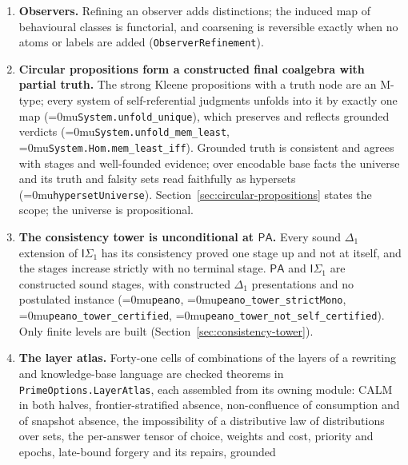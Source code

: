 \documentclass[11pt]{article}
\newcommand{\leanname}[1]{\textup{\Urlmuskip=0mu\relax\nolinkurl{#1}}}
\theoremstyle{definition}
\theoremstyle{remark}
\begin{document}
\begin{enumerate}
  determines the equations, the equations determine behavioural equivalence
  under every observer and equality in every model, fine behavioural
  equivalence determines coarse, occurrence identity erases to endpoints, and
  lineage determines reachability only (\texttt{IdentityNotions}).  A family
  descends through an observer exactly when it is invariant under that
  observer's behavioural equivalence (\nolinkurl{descendsThrough_iff}).
\item \textbf{Observers.}  Refining an observer adds distinctions; the induced
  map of behavioural classes is functorial, and coarsening is reversible
  exactly when no atoms or labels are added (\texttt{ObserverRefinement}).
\item \textbf{Circular propositions form a constructed final coalgebra with
  partial truth.}  The strong Kleene propositions with a truth node are an
  M-type; every system of self-referential judgments unfolds into it by
  exactly one map (\leanname{System.unfold_unique}), which preserves and
  reflects grounded verdicts (\leanname{System.unfold_mem_least},
  \leanname{System.Hom.mem_least_iff}).  Grounded truth is consistent and
  agrees with stages and well-founded evidence; over encodable base facts the
  universe and its truth and falsity sets read faithfully as hypersets
  (\leanname{hypersetUniverse}).  Section~\ref{sec:circular-propositions}
  states the scope; the universe is propositional.
\item \textbf{The consistency tower is unconditional at $\mathsf{PA}$.}  Every
  sound $\Delta_1$ extension of $\mathsf{I}\Sigma_1$ has its consistency proved
  one stage up and not at itself, and the stages increase strictly with no
  terminal stage.  $\mathsf{PA}$ and $\mathsf{I}\Sigma_1$ are constructed sound
  stages, with constructed $\Delta_1$ presentations and no postulated instance
  (\leanname{peano}, \leanname{peano_tower_strictMono},
  \leanname{peano_tower_certified}, \leanname{peano_tower_not_self_certified}).
  Only finite levels are built (Section~\ref{sec:consistency-tower}).
\item \textbf{The layer atlas.}  Forty-one cells of combinations of the
  layers of a rewriting and knowledge-base language are checked theorems in
  \nolinkurl{PrimeOptions.LayerAtlas}, each assembled from its owning module:
  CALM in both halves, frontier-stratified absence, non-confluence of
  consumption and of snapshot absence, the impossibility of a distributive law
  of distributions over sets, the per-answer tensor of choice, weights and
  cost, priority and epochs, late-bound forgery and its repairs, grounded

\end{enumerate}
\end{document}
